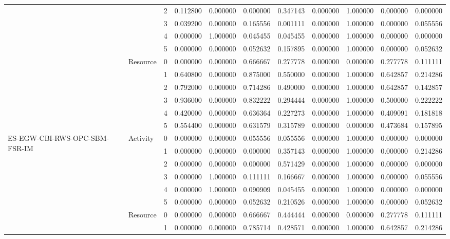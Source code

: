 \begin{tabular}{lllrrrrrrrr}
 &  & 2 & 0.112800 & 0.000000 & 0.000000 & 0.347143 & 0.000000 & 1.000000 & 0.000000 & 0.000000 \\
 &  & 3 & 0.039200 & 0.000000 & 0.165556 & 0.001111 & 0.000000 & 1.000000 & 0.000000 & 0.055556 \\
 &  & 4 & 0.000000 & 1.000000 & 0.045455 & 0.045455 & 0.000000 & 1.000000 & 0.000000 & 0.000000 \\
 &  & 5 & 0.000000 & 0.000000 & 0.052632 & 0.157895 & 0.000000 & 1.000000 & 0.000000 & 0.052632 \\
\cline{2-11}
 & \multirow[t]{6}{*}{Resource} & 0 & 0.000000 & 0.000000 & 0.666667 & 0.277778 & 0.000000 & 0.000000 & 0.277778 & 0.111111 \\
 &  & 1 & 0.640800 & 0.000000 & 0.875000 & 0.550000 & 0.000000 & 1.000000 & 0.642857 & 0.214286 \\
 &  & 2 & 0.792000 & 0.000000 & 0.714286 & 0.490000 & 0.000000 & 1.000000 & 0.642857 & 0.142857 \\
 &  & 3 & 0.936000 & 0.000000 & 0.832222 & 0.294444 & 0.000000 & 1.000000 & 0.500000 & 0.222222 \\
 &  & 4 & 0.420000 & 0.000000 & 0.636364 & 0.227273 & 0.000000 & 1.000000 & 0.409091 & 0.181818 \\
 &  & 5 & 0.554400 & 0.000000 & 0.631579 & 0.315789 & 0.000000 & 0.000000 & 0.473684 & 0.157895 \\
\cline{1-11} \cline{2-11}
\multirow[t]{12}{*}{ES-EGW-CBI-RWS-OPC-SBM-FSR-IM} & \multirow[t]{6}{*}{Activity} & 0 & 0.000000 & 0.000000 & 0.055556 & 0.055556 & 0.000000 & 1.000000 & 0.000000 & 0.000000 \\
 &  & 1 & 0.000000 & 0.000000 & 0.000000 & 0.357143 & 0.000000 & 1.000000 & 0.000000 & 0.214286 \\
 &  & 2 & 0.000000 & 0.000000 & 0.000000 & 0.571429 & 0.000000 & 1.000000 & 0.000000 & 0.000000 \\
 &  & 3 & 0.000000 & 1.000000 & 0.111111 & 0.166667 & 0.000000 & 1.000000 & 0.000000 & 0.055556 \\
 &  & 4 & 0.000000 & 1.000000 & 0.090909 & 0.045455 & 0.000000 & 1.000000 & 0.000000 & 0.000000 \\
 &  & 5 & 0.000000 & 0.000000 & 0.052632 & 0.210526 & 0.000000 & 1.000000 & 0.000000 & 0.052632 \\
\cline{2-11}
 & \multirow[t]{6}{*}{Resource} & 0 & 0.000000 & 0.000000 & 0.666667 & 0.444444 & 0.000000 & 0.000000 & 0.277778 & 0.111111 \\
 &  & 1 & 0.000000 & 0.000000 & 0.785714 & 0.428571 & 0.000000 & 1.000000 & 0.642857 & 0.214286 \\

\end{tabular}
